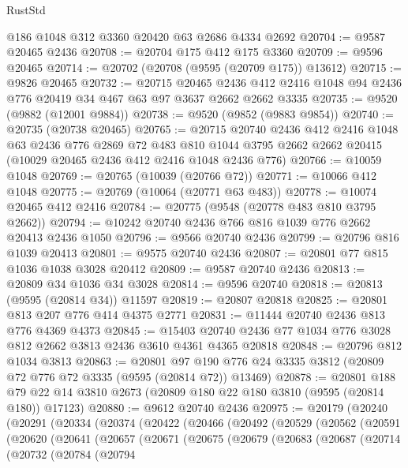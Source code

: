 \begin{lexlean}{RustStd}
\begin{coremodule}
    @186
    @1048
    @312
    @3360
    @20420
    @63
    @2686
    @4334
    @2692
@20704 := @9587 @20465 @2436
@20708 := @20704 @175 @412 @175 @3360
@20709 := @9596 @20465
@20714 := @20702 (@20708 (@9595 (@20709 @175)) @13612)
@20715 := @9826 @20465
@20732 := @20715
    @20465
    @2436
    @412
    @2416
    @1048
    @94
    @2436
    @776
    @20419
    @34
    @467
    @63
    @97
    @3637
    @2662
    @2662
    @3335
@20735 := @9520 (@9882 (@12001 @9884))
@20738 := @9520 (@9852 (@9883 @9854))
@20740 := @20735 (@20738 @20465)
@20765 := @20715
    @20740
    @2436
    @412
    @2416
    @1048
    @63
    @2436
    @776
    @2869
    @72
    @483
    @810
    @1044
    @3795
    @2662
    @2662
    @20415
    (@10029 @20465 @2436 @412 @2416 @1048 @2436 @776)
@20766 := @10059 @1048
@20769 := @20765 (@10039 (@20766 @72))
@20771 := @10066 @412 @1048
@20775 := @20769 (@10064 (@20771 @63 @483))
@20778 := @10074 @20465 @412 @2416
@20784 := @20775 (@9548 (@20778 @483 @810 @3795 @2662))
@20794 := @10242 @20740 @2436 @766 @816 @1039 @776 @2662 @20413 @2436 @1050
@20796 := @9566 @20740 @2436
@20799 := @20796 @816 @1039 @20413
@20801 := @9575 @20740 @2436
@20807 := @20801 @77 @815 @1036 @1038 @3028 @20412
@20809 := @9587 @20740 @2436
@20813 := @20809 @34 @1036 @34 @3028
@20814 := @9596 @20740
@20818 := @20813 (@9595 (@20814 @34)) @11597
@20819 := @20807 @20818
@20825 := @20801 @813 @207 @776 @414 @4375 @2771
@20831 := @11444 @20740 @2436 @813 @776 @4369 @4373
@20845 := @15403 @20740 @2436 @77 @1034 @776 @3028 @812 @2662 @3813 @2436 @3610 @4361 @4365 @20818
@20848 := @20796 @812 @1034 @3813
@20863 := @20801
    @97
    @190
    @776
    @24
    @3335
    @3812
    (@20809 @72 @776 @72 @3335 (@9595 (@20814 @72)) @13469)
@20878 := @20801
    @188
    @79
    @22
    @14
    @3810
    @2673
    (@20809 @180 @22 @180 @3810 (@9595 (@20814 @180)) @17123)
@20880 := @9612 @20740 @2436
@20975 := @20179
    (@20240
      (@20291
        (@20334
          (@20374
            (@20422
              (@20466
                (@20492
                  (@20529
                    (@20562
                      (@20591
                        (@20620
                          (@20641
                            (@20657
                              (@20671
                                (@20675
                                  (@20679
                                    (@20683
                                      (@20687
                                        (@20714
                                          (@20732
                                            (@20784
                                              (@20794

\end{coremodule}
\end{lexlean}
